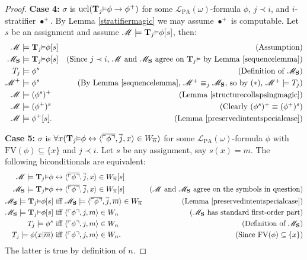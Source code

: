 \documentclass[reqno]{article}
\theoremstyle{definition}
\def\L{\mathscr{L}}
\def\M{\mathscr{M}}
\def\T{\mathbf{T}}
\def\S{\mathbf{S}}
\def\FV{\mathrm{FV}}
\def\LPA{\L_{\mathrm{PA}}}
\def\myequiv{\equiv}
\renewcommand{\Pr}[1]{\T_{#1}\mbox{\small${\vDash}$}}
\newcommand{\ucl}[1]{\mathrm{ucl}(#1)}
\newcommand{\case}[1]{\textbf{Case #1:}}
\begin{document}
\begin{proof}
\item
\case4
$\sigma$ is $\ucl{\Pr j\phi\rightarrow\phi^+}$ for some $\LPA(\omega)$-formula $\phi$, $j\prec i$,
and $i$-stratifier $\bullet^+$.
By Lemma \ref{stratifiermagic} we may assume $\bullet^+$ is computable.
Let $s$ be an assignment and assume $\M\models \Pr j\phi[s]$, then:
\begin{align*}
\M &\models \Pr j\phi[s]
  &\mbox{(Assumption)}\\
\M_\S &\models \Pr j\phi[s]
  &\mbox{(Since $j\prec i$, $\M$ and $\M_\S$ agree on $\Pr j$ by Lemma \ref{sequencelemma})}\\
T_j &\models \phi^s
  &\mbox{(Definition of $\M_\S$)}\\
\M^+ &\models \phi^s
  &\mbox{(By Lemma \ref{sequencelemma}, $\M^+\myequiv_j\M_\S$, so by ($*$), $\M^+\models T_j$)}\\
\M &\models (\phi^s)^+
  &\mbox{(Lemma \ref{structurecollapsingmagic})}\\
\M &\models (\phi^+)^s
  &\mbox{(Clearly $(\phi^s)^+\equiv(\phi^+)^s$)}\\
\M &\models \phi^+[s].
  &\mbox{(Lemma \ref{preservedintentspecialcase})}
\end{align*}


\item
\case5
$\sigma$ is $\forall x(\Pr j\phi\leftrightarrow\langle\overline{\ulcorner\phi\urcorner},\overline j,
x\rangle\in W_{\overline n})$ for some $\LPA(\omega)$-formula $\phi$ with $\FV(\phi)\subseteq\{x\}$
and $j\prec i$.
Let $s$ be any assignment, say $s(x)=m$.
The following biconditionals are equivalent:
\begin{align*}
\M \models \Pr j\phi&\leftrightarrow
\langle\overline{\ulcorner\phi\urcorner}, \overline j,x\rangle\in W_{\overline n}[s]\\
\M_\S \models \Pr j\phi&\leftrightarrow
\langle\overline{\ulcorner\phi\urcorner}, \overline j,x\rangle\in W_{\overline n}[s]
  &\mbox{($\M$ and $\M_\S$ agree on the symbols in question)}\\
\M_\S \models \Pr j\phi[s]&\mbox{ iff }\M_\S\models
\langle\overline{\ulcorner\phi\urcorner}, \overline j,\overline m\rangle\in W_{\overline n}
  &\mbox{(Lemma \ref{preservedintentspecialcase})}\\
\M_\S \models \Pr j\phi[s]&\mbox{ iff }
\langle\ulcorner\phi\urcorner,j,m\rangle\in W_n
  &\mbox{($\M_\S$ has standard first-order part)}\\
T_j \models \phi^s&\mbox{ iff }
\langle\ulcorner\phi\urcorner,j,m\rangle\in W_n
  &\mbox{(Definition of $\M_\S$)}\\
T_j \models \phi(x|\overline m)&\mbox{ iff }
\langle\ulcorner\phi\urcorner,j,m\rangle\in W_n.
  &\mbox{(Since $\FV(\phi)\subseteq\{x\}$)}
\end{align*}
The latter is true by definition of $n$.


\end{proof}
\end{document}
